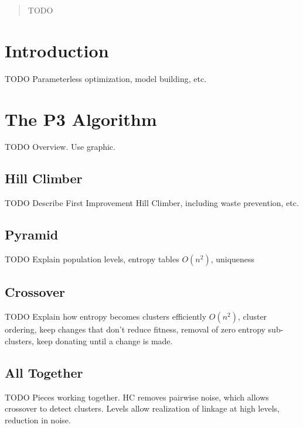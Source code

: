 \documentclass{sig-alternate}
\begin{document}
\maketitle
\begin{abstract}
TODO
\end{abstract}




\section{Introduction}
TODO Parameterless optimization, model building, etc.

\section{The P3 Algorithm}
TODO Overview.  Use graphic.

\subsection{Hill Climber}
TODO Describe First Improvement Hill Climber, including waste prevention, etc.

\subsection{Pyramid}
TODO Explain population levels, entropy tables $O(n^2)$, uniqueness

\subsection{Crossover}
TODO Explain how entropy becomes clusters efficiently $O(n^2)$, cluster ordering,
keep changes that don't reduce fitness, removal of zero entropy sub-clusters,
keep donating until a change is made.

\subsection{All Together}
TODO Pieces working together.  HC removes pairwise noise, which allows crossover to detect
clusters.  Levels allow realization of linkage at high levels, reduction in noise.
\end{document}
